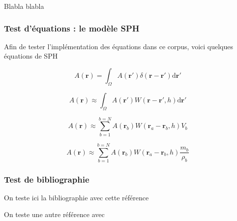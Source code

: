 Blabla blabla

\subsubsection{Test d'équations : le modèle SPH }

Afin de tester l'implémentation des équations dans ce corpus, voici quelques équations de SPH

\begin{equation}
	A(\mathbf{r}) = \int_\Omega A(\mathbf{r}') \delta(\mathbf{r}  - \mathbf{r}') \mathrm d \mathbf{r}'
\end{equation}

\begin{equation}
	A(\mathbf{r}) \approx \int_\Omega A(\mathbf{r}') W(\mathbf{r}  - \mathbf{r}',h) \mathrm d \mathbf{r}'
\end{equation}

\begin{equation}
	A(\mathbf{r}) \approx \sum_{b=1}^{b=N} A(\mathbf{r}_b) W(\mathbf{r}_a  - \mathbf{r}_b,h) V_b
\end{equation}

\begin{equation}
	A(\mathbf{r}) \approx \sum_{b=1}^{b=N} A(\mathbf{r}_b) W(\mathbf{r}_a  - \mathbf{r}_b,h) \frac{m_b}{\rho_b}
\end{equation}

\subsubsection{Test de  bibliographie}

On teste ici la bibliographie avec cette référence \cite{goffin2013development}


On teste une autre référence avec \cite{monaghan1992smoothed}
 
